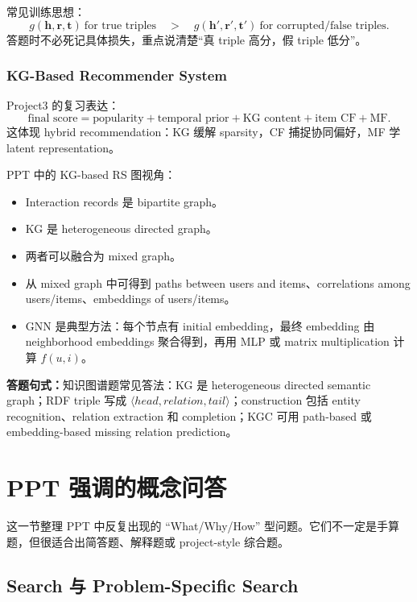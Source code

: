\documentclass[UTF8,11pt,a4paper]{ctexart}
\newcommand{\ans}[1]{\textbf{答题句式：}#1}
\begin{document}
常见训练思想：
\[
g(\mathbf{h},\mathbf{r},\mathbf{t})\ \text{for true triples}
\quad > \quad
g(\mathbf{h}',\mathbf{r}',\mathbf{t}')\ \text{for corrupted/false triples}.
\]
答题时不必死记具体损失，重点说清楚“真 triple 高分，假 triple 低分”。

\subsubsection{KG-Based Recommender System}

Project3 的复习表达：
\[
\text{final score}=\text{popularity}+\text{temporal prior}+\text{KG content}+\text{item CF}+\text{MF}.
\]
这体现 hybrid recommendation：KG 缓解 sparsity，CF 捕捉协同偏好，MF 学 latent representation。

PPT 中的 KG-based RS 图视角：
\begin{itemize}
\item Interaction records 是 bipartite graph。
\item KG 是 heterogeneous directed graph。
\item 两者可以融合为 mixed graph。
\item 从 mixed graph 中可得到 paths between users and items、correlations among users/items、embeddings of users/items。
\item GNN 是典型方法：每个节点有 initial embedding，最终 embedding 由 neighborhood embeddings 聚合得到，再用 MLP 或 matrix multiplication 计算 $f(u,i)$。
\end{itemize}

\ans{知识图谱题常见答法：KG 是 heterogeneous directed semantic graph；RDF triple 写成
$\langle head, relation, tail\rangle$；construction 包括 entity recognition、relation extraction 和 completion；KGC 可用 path-based 或 embedding-based missing relation prediction。}

\section{PPT 强调的概念问答}

这一节整理 PPT 中反复出现的 ``What/Why/How'' 型问题。它们不一定是手算题，但很适合出简答题、解释题或 project-style 综合题。

\subsection{Search 与 Problem-Specific Search}
\end{document}
